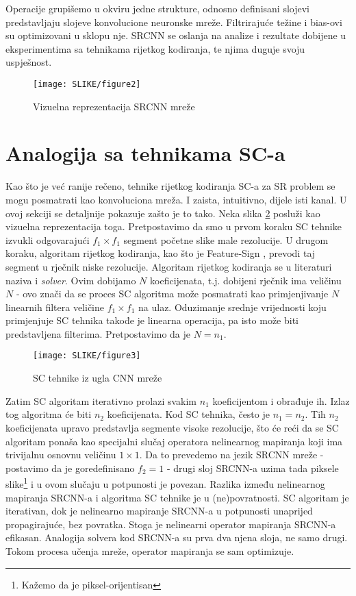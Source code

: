 \documentclass[12pt]{report}
\numberwithin{equation}{section}
\begin{document}
Operacije grupišemo u okviru jedne strukture, odnosno  definisani slojevi predstavljaju slojeve konvolucione neuronske mreže. Filtrirajuće težine i bias-ovi su optimizovani u sklopu nje. SRCNN se oslanja na analize i rezultate dobijene u eksperimentima sa tehnikama rijetkog kodiranja, te njima duguje svoju uspješnost. 

\begin{figure}[h]
\texttt{[image: SLIKE/figure2]}
\centering
\caption{Vizuelna reprezentacija SRCNN mreže \cite{main}}
\label{fig:srcnn}
\end{figure}


\section{Analogija sa tehnikama SC-a}\label{ch2}
Kao što je već ranije rečeno, tehnike rijetkog kodiranja SC-a za SR problem se mogu posmatrati kao konvoluciona mreža. I zaista, intuitivno, dijele isti kanal. U ovoj sekciji se detaljnije pokazuje zašto je to tako. Neka slika \ref{fig:rep} posluži kao vizuelna reprezentacija toga. 
Pretpostavimo da smo u prvom koraku SC tehnike izvukli odgovarajući $f_1 \times f_1$ segment početne slike male rezolucije. U drugom koraku, algoritam rijetkog kodiranja, kao što je Feature-Sign \cite{sparse}, prevodi taj segment u rječnik niske rezolucije. Algoritam rijetkog kodiranja se u literaturi naziva i \textit{solver}. Ovim dobijamo $N$ koeficijenata, t.j. dobijeni rječnik ima veličinu $N$ - ovo znači da se proces SC algoritma može posmatrati kao primjenjivanje $N$ linearnih filtera veličine $f_1 \times f_1$ na ulaz. Oduzimanje srednje vrijednosti koju primjenjuje SC tehnika takođe je linearna operacija, pa isto može biti predstavljena filterima. Pretpostavimo da je $N = n_1$. 


\begin{figure}[h]
\texttt{[image: SLIKE/figure3]}
\centering
\caption{SC tehnike iz ugla CNN mreže \cite{main}}
\label{fig:rep}
\end{figure}

Zatim SC algoritam iterativno prolazi svakim $n_1$ koeficijentom i obrađuje ih. Izlaz tog algoritma će biti $n_2$ koeficijenata. Kod SC tehnika, često je $n_1 = n_2$. Tih $n_2$ koeficijenata upravo predstavlja segmente visoke rezolucije, što će reći da se SC algoritam ponaša kao specijalni slučaj operatora nelinearnog mapiranja koji ima trivijalnu osnovnu veličinu $1 \times 1$. Da to prevedemo na jezik SRCNN mreže - postavimo da je goredefinisano $f_2 = 1$  - drugi sloj SRCNN-a uzima tada piksele slike\footnote{Kažemo da je piksel-orijentisan} i u ovom slučaju u potpunosti je povezan. Razlika između nelinearnog mapiranja SRCNN-a i algoritma SC tehnike je u (ne)povratnosti. SC algoritam je iterativan, dok je nelinearno mapiranje SRCNN-a u potpunosti unaprijed propagirajuće, bez povratka. Stoga je nelinearni operator mapiranja SRCNN-a efikasan. Analogija solvera kod SRCNN-a su prva dva njena sloja, ne samo drugi. Tokom procesa učenja mreže, operator mapiranja se sam optimizuje.     
\end{document}
